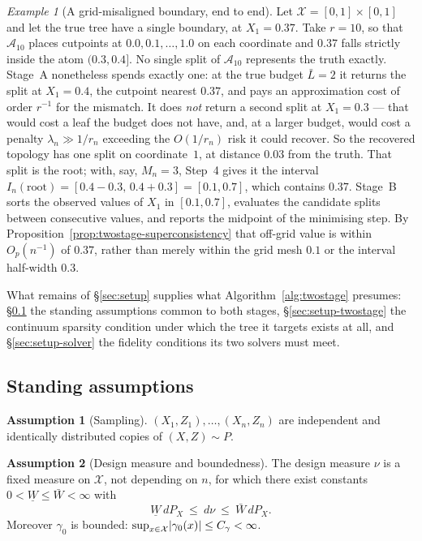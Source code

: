 \documentclass[11pt]{article}
\theoremstyle{plain}
\theoremstyle{definition}
\newtheorem{assumption}{Assumption}
\theoremstyle{remark}
\newtheorem{example}[theorem]{Example}
\newcommand{\cX}{\mathcal{X}}
\newcommand{\cA}{\mathcal{A}}
\DeclarePairedDelimiter{\abs}{\lvert}{\rvert}
\begin{document}
\begin{example}[A grid-misaligned boundary, end to end]\label{ex:offgrid-1d}
Let $\cX=[0,1]\times[0,1]$ and let the true tree have a single boundary, at
$X_1=0.37$. Take $r=10$, so that $\cA_{10}$ places cutpoints at
$0.0,0.1,\dots,1.0$ on each coordinate and $0.37$ falls strictly inside the
atom $(0.3,0.4]$. No single split of $\cA_{10}$ represents the truth exactly.
Stage~A nonetheless spends exactly one: at the true budget $\bar L=2$ it
returns the split at $X_1=0.4$, the cutpoint nearest $0.37$, and pays an
approximation cost of order $r^{-1}$ for the mismatch. It does \emph{not}
return a second split at $X_1=0.3$ --- that would cost a leaf the budget does
not have, and, at a larger budget, would cost a penalty $\lambda_n\gg1/r_n$
exceeding the $O(1/r_n)$ risk it could recover. So the recovered topology has
one split on coordinate~$1$, at distance $0.03$ from the truth. That split is
the root; with, say, $M_n=3$, Step~4 gives it the interval
$I_n(\mathrm{root})=[0.4-0.3,\,0.4+0.3]=[0.1,0.7]$, which contains $0.37$.
Stage~B sorts the observed values of $X_1$ in $[0.1,0.7]$, evaluates the
candidate splits between consecutive values, and reports the midpoint of the
minimising step. By Proposition~\ref{prop:twostage-superconsistency} that
off-grid value is within $O_p(n^{-1})$ of $0.37$, rather than merely within
the grid mesh $0.1$ or the interval half-width $0.3$.
\end{example}

What remains of \S\ref{sec:setup} supplies what Algorithm~\ref{alg:twostage}
presumes: \S\ref{sec:setup-assumptions} the standing assumptions common to
both stages, \S\ref{sec:setup-twostage} the continuum sparsity condition
under which the tree it targets exists at all, and \S\ref{sec:setup-solver}
the fidelity conditions its two solvers must meet.

\subsection{Standing assumptions}\label{sec:setup-assumptions}

\begin{assumption}[Sampling]\label{ass:iid}
$(X_1,Z_1),\dots,(X_n,Z_n)$ are independent and identically distributed copies
of $(X,Z)\sim P$.
\end{assumption}

\begin{assumption}[Design measure and boundedness]\label{ass:design}
The design measure $\nu$ is a fixed measure on $\cX$, not depending on $n$,
for which there exist constants $0<\underline W\le\bar W<\infty$ with
\[
  \underline W\,dP_X\ \le\ d\nu\ \le\ \bar W\,dP_X .
\]
Moreover $\gamma_0$ is bounded: $\sup_{x\in\cX}\abs{\gamma_0(x)}\le
C_\gamma<\infty$.
\end{assumption}
\end{document}
